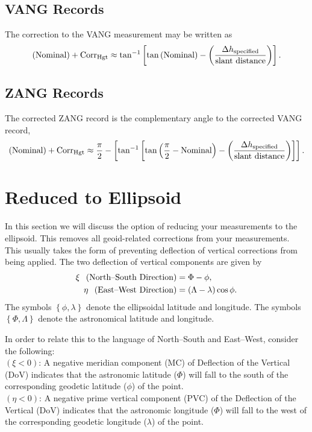 \subsection{VANG Records}
The correction to the VANG measurement may be written as
\begin{equation}
\left(\text{Nominal}\right) + \text{Corr}_{\text{Hgt}}\approx\tan^{-1}\left[\tan\left(\text{Nominal}\right)-\left(\frac{\Delta h_{\text{specified}}}{\text{slant distance}}\right)\right].
\end{equation}
\subsection{ZANG Records}
The corrected ZANG record is the complementary angle to the corrected VANG record,
\begin{equation}
\left(\text{Nominal}\right)+\text{Corr}_{\text{Hgt}}\approx\frac{\pi}{2}-\left[\tan^{-1}\left[\tan\left(\frac{\pi}{2}-\text{Nominal}\right)-\left(\frac{\Delta h_{\text{specified}}}{\text{slant distance}}\right)\right]\right].
\end{equation}
\section{Reduced to Ellipsoid}
In this section we will discuss the option of reducing your measurements to the ellipsoid.  This removes all geoid-related corrections from your measurements.  This usually takes the form of preventing deflection of vertical corrections from being applied.  The two deflection of vertical components are given by
\begin{equation}
\begin{split}
\xi\hspace*{2mm}\left(\text{North--South Direction}\right)&=\Phi-\phi,\\
\eta\hspace*{2mm}\left(\text{East--West Direction}\right)&=\left(\Lambda-\lambda\right)\cos\phi.
\end{split}
\end{equation}
The symbols $\left\{\phi,\lambda\right\}$ denote the ellipsoidal latitude and longitude.  The symbols $\left\{\Phi,\Lambda\right\}$ denote the astronomical latitude and longitude.

In order to relate this to the language of North--South and East--West, consider the following:\\
$(\xi<0)$: A negative meridian component (MC) of Deflection of the Vertical (DoV) indicates that the astronomic latitude ($\Phi$) will fall to the south of the corresponding geodetic latitude ($\phi$) of the point.\\
$(\eta<0)$: A negative prime vertical component (PVC) of the Deflection of the Vertical (DoV) indicates that the astronomic longitude ($\Phi$) will fall to the west of the corresponding geodetic longitude ($\lambda$) of the point.

